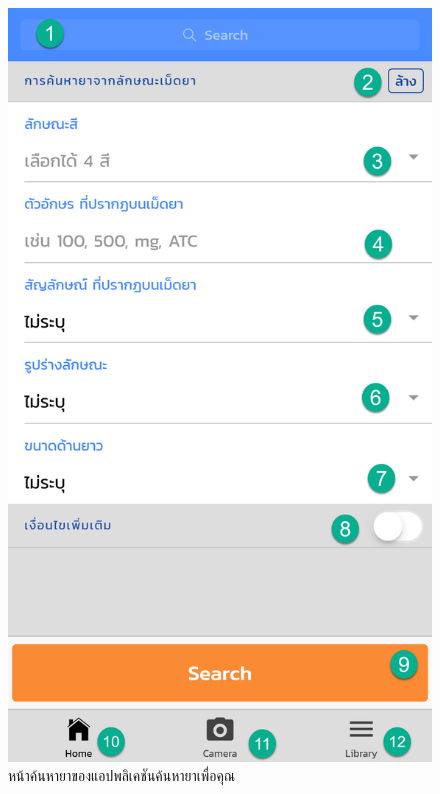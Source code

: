 \begin{figure}[H]
    \centering\includegraphics[scale=0.2]{Figures/7/15}
    \caption{หน้าค้นหายาของแอปพลิเคชันค้นหายาเพื่อคุณ}
    \label{Fig:howto2}
\end{figure}

